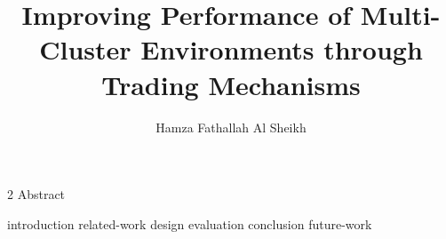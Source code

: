 \documentclass[11pt,Chicago]{uuthesis2e}
\author                 {Hamza Fathallah Al Sheikh}
\title                  {Improving Performance of Multi-Cluster Environments through Trading Mechanisms}
\begin{document}
\frontmatterformat
\titlepage
\copyrightpage
\dissertationapproval
\setcounter {page}     {2}             %
 {Abstract}
\dedicationpage
\tableofcontents
\listoffigures
\listoftables
%

 {}




\maintext       %

\pagestyle{headings} %

 {introduction}
 {related-work}
 {design}
 {evaluation}
 {conclusion}
 {future-work}
%
\end{document}
